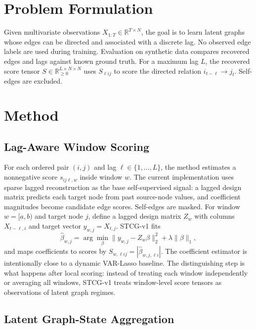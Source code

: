 \documentclass[sigconf,review,anonymous]{acmart}
\begin{document}
\section{Problem Formulation}

Given multivariate observations $X_{1:T} \in \mathbb{R}^{T \times N}$, the goal is to learn latent graphs whose edges can be directed and associated with a discrete lag.
No observed edge labels are used during training.
Evaluation on synthetic data compares recovered edges and lags against known ground truth.
For a maximum lag $L$, the recovered score tensor $S \in \mathbb{R}_{\geq 0}^{L \times N \times N}$ uses $S_{\ell i j}$ to score the directed relation $i_{t-\ell}\rightarrow j_t$.
Self-edges are excluded.

\section{Method}

\subsection{Lag-Aware Window Scoring}

For each ordered pair $(i,j)$ and lag $\ell \in \{1,\ldots,L\}$, the method estimates a nonnegative score $s_{ij\ell,w}$ inside window $w$.
The current implementation uses sparse lagged reconstruction as the base self-supervised signal: a lagged design matrix predicts each target node from past source-node values, and coefficient magnitudes become candidate edge scores.
Self-edges are masked.
For window $w=[a,b)$ and target node $j$, define a lagged design matrix $Z_w$ with columns $X_{t-\ell,i}$ and target vector $y_{w,j}=X_{t,j}$.
STCG-v1 fits
\[
\hat{\beta}_{w,j}
= \arg\min_{\beta}
\|y_{w,j}-Z_w\beta\|_2^2 + \lambda \|\beta\|_1,
\]
and maps coefficients to scores by $S_{w,\ell i j}=|\hat{\beta}_{w,j,\ell i}|$.
The coefficient estimator is intentionally close to a dynamic VAR-Lasso baseline.
The distinguishing step is what happens after local scoring: instead of treating each window independently or averaging all windows, STCG-v1 treats window-level score tensors as observations of latent graph regimes.

\subsection{Latent Graph-State Aggregation}
\end{document}
